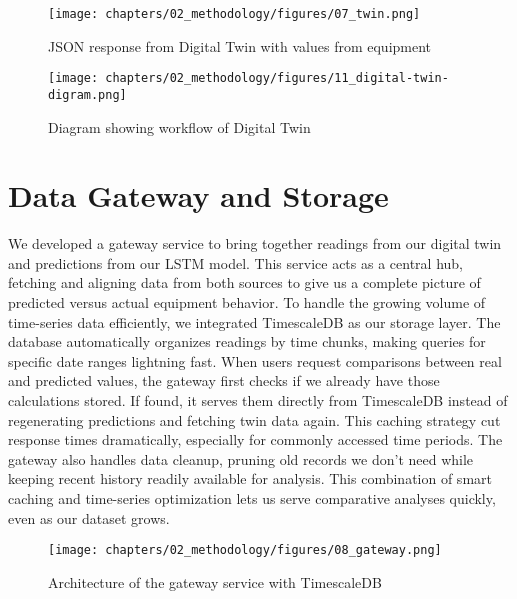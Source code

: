 \begin{figure}[H]
    \centering
    \texttt{[image: chapters/02\_methodology/figures/07\_twin.png]}
    \caption{JSON response from Digital Twin with values from equipment}
\end{figure}

\begin{figure}
    \centering
    \texttt{[image: chapters/02\_methodology/figures/11\_digital-twin-digram.png]}
    \caption{Diagram showing workflow of Digital Twin}
    \label{fig:digital-twin-workflow}
\end{figure}

\section{Data Gateway and Storage}
We developed a gateway service to bring together readings from our digital twin and predictions from our LSTM model. This service acts as a central hub, fetching and aligning data from both sources to give us a complete picture of predicted versus actual equipment behavior. To handle the growing volume of time-series data efficiently, we integrated TimescaleDB as our storage layer. The database automatically organizes readings by time chunks, making queries for specific date ranges lightning fast. When users request comparisons between real and predicted values, the gateway first checks if we already have those calculations stored. If found, it serves them directly from TimescaleDB instead of regenerating predictions and fetching twin data again. This caching strategy cut response times dramatically, especially for commonly accessed time periods. The gateway also handles data cleanup, pruning old records we don't need while keeping recent history readily available for analysis. This combination of smart caching and time-series optimization lets us serve comparative analyses quickly, even as our dataset grows.

\begin{figure}[H]
    \centering
    \texttt{[image: chapters/02\_methodology/figures/08\_gateway.png]}
    \caption{Architecture of the gateway service with TimescaleDB}
\end{figure}

